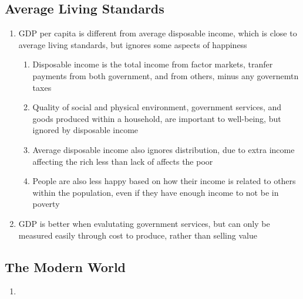 \documentclass[11 pt, twoside]{article}
\begin{document}
\subsection{Average Living Standards}
\begin{enumerate}
\item GDP per capita is different from average disposable income, which is close to average living standards, but ignores some aspects of happiness
\begin{enumerate}
\item Disposable income is the total income from factor markets, tranfer payments from both government, and from others, minus any governemtn taxes
\item Quality of social and physical environment, government services, and goods produced within a household, are important to well-being, but ignored by disposable income
\item Average disposable income also ignores distribution, due to extra income affecting the rich less than lack of affects the poor
\item People are also less happy based on how their income is related to others within the population, even if they have enough income to not be in poverty
\end{enumerate}
\item GDP is better when evalutating government services, but can only be measured easily through cost to produce, rather than selling value
\end{enumerate}

\subsection{The Modern World}
\begin{enumerate}
\item %
\end{enumerate}
\end{document}
